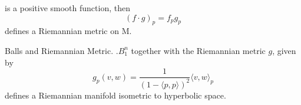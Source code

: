 \documentclass{article}
\begin{document}
is a positive smooth function, then
\begin{equation}
  (f \cdot g)_p = f_p g_p
\end{equation}
defines a Riemannian metric on M.

\begin{Example}[]{Balls and Riemannian Metric.}
.$B_1^n$ together with the Riemannian metric $g$, given by
\begin{equation}
  g_p(v, w) = \frac{1}{(1-\langle p, p \rangle)^2}\langle v, w \rangle_{p}
\end{equation}
defines a Riemannian manifold isometric to hyperbolic space. 
\end{Example}

\printindex
\end{document}
